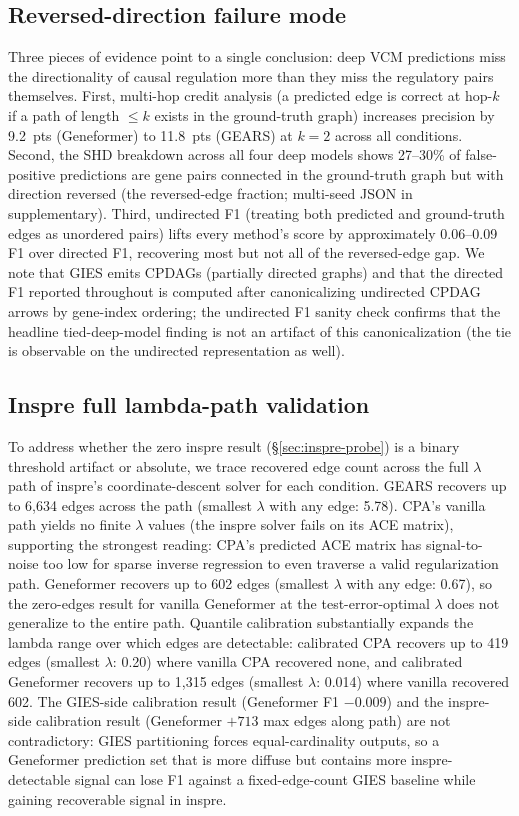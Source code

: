 \documentclass{article}
\theoremstyle{plain}
\theoremstyle{definition}
\theoremstyle{remark}
\begin{document}
\subsection{Reversed-direction failure mode}
\label{app:reversed}
Three pieces of evidence point to a single conclusion: deep VCM predictions miss the directionality of causal regulation more than they miss the regulatory pairs themselves. First, multi-hop credit analysis (a predicted edge is correct at hop-$k$ if a path of length $\leq k$ exists in the ground-truth graph) increases precision by 9.2~pts (Geneformer) to 11.8~pts (GEARS) at $k{=}2$ across all conditions. Second, the SHD breakdown across all four deep models shows 27--30\% of false-positive predictions are gene pairs connected in the ground-truth graph but with direction reversed (the reversed-edge fraction; multi-seed JSON in supplementary). Third, undirected F1 (treating both predicted and ground-truth edges as unordered pairs) lifts every method's score by approximately 0.06--0.09 F1 over directed F1, recovering most but not all of the reversed-edge gap. We note that GIES emits CPDAGs (partially directed graphs) and that the directed F1 reported throughout is computed after canonicalizing undirected CPDAG arrows by gene-index ordering; the undirected F1 sanity check confirms that the headline tied-deep-model finding is not an artifact of this canonicalization (the tie is observable on the undirected representation as well).

\subsection{Inspre full lambda-path validation}
\label{app:inspre-path}
To address whether the zero inspre result (\S\ref{sec:inspre-probe}) is a binary threshold artifact or absolute, we trace recovered edge count across the full $\lambda$ path of inspre's coordinate-descent solver for each condition. GEARS recovers up to 6{,}634 edges across the path (smallest $\lambda$ with any edge: 5.78). CPA's vanilla path yields no finite $\lambda$ values (the inspre solver fails on its ACE matrix), supporting the strongest reading: CPA's predicted ACE matrix has signal-to-noise too low for sparse inverse regression to even traverse a valid regularization path. Geneformer recovers up to 602 edges (smallest $\lambda$ with any edge: 0.67), so the zero-edges result for vanilla Geneformer at the test-error-optimal $\lambda$ does not generalize to the entire path. Quantile calibration substantially expands the lambda range over which edges are detectable: calibrated CPA recovers up to 419 edges (smallest $\lambda$: 0.20) where vanilla CPA recovered none, and calibrated Geneformer recovers up to 1{,}315 edges (smallest $\lambda$: 0.014) where vanilla recovered 602. The GIES-side calibration result (Geneformer F1 $-0.009$) and the inspre-side calibration result (Geneformer $+713$ max edges along path) are not contradictory: GIES partitioning forces equal-cardinality outputs, so a Geneformer prediction set that is more diffuse but contains more inspre-detectable signal can lose F1 against a fixed-edge-count GIES baseline while gaining recoverable signal in inspre.
\end{document}
